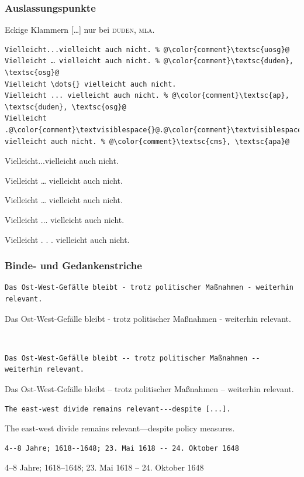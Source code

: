 \documentclass[handout]{beamer}
\begin{document}
\begin{frame}[fragile]
    \frametitle{Auslassungspunkte}
    Eckige Klammern [\dots{}] nur bei \textsc{duden}, \textsc{mla}.

    \pause

    \begin{lstlisting}[escapechar=\@]
Vielleicht...vielleicht auch nicht. % @\color{comment}\textsc{uosg}@
Vielleicht … vielleicht auch nicht. % @\color{comment}\textsc{duden}, \textsc{osg}@
Vielleicht \dots{} vielleicht auch nicht.
Vielleicht ... vielleicht auch nicht. % @\color{comment}\textsc{ap}, \textsc{duden}, \textsc{osg}@
Vielleicht .@\color{comment}\textvisiblespace{}@.@\color{comment}\textvisiblespace{}@. vielleicht auch nicht. % @\color{comment}\textsc{cms}, \textsc{apa}@
        \end{lstlisting}

    Vielleicht...vielleicht auch nicht.

    Vielleicht … vielleicht auch nicht.

    Vielleicht \dots{} vielleicht auch nicht.

    Vielleicht ... vielleicht auch nicht.

    Vielleicht . . . vielleicht auch nicht.\\[2ex]
\end{frame}

\begin{frame}[fragile]
    \frametitle{Binde- und Gedankenstriche}%
    \begin{wrong}
        \begin{lstlisting}
Das Ost-West-Gefälle bleibt - trotz politischer Maßnahmen - weiterhin relevant.
        \end{lstlisting}
        Das Ost-West-Gefälle bleibt - trotz politischer Maßnahmen - weiterhin relevant.
    \end{wrong}\\[2ex]\pause

    \begin{lstlisting}
Das Ost-West-Gefälle bleibt -- trotz politischer Maßnahmen -- weiterhin relevant.
    \end{lstlisting}
    Das Ost-West-Gefälle bleibt -- trotz politischer Maßnahmen -- weiterhin relevant.\\[2ex]\pause

    \begin{lstlisting}
The east-west divide remains relevant---despite [...].
    \end{lstlisting}
    The east-west divide remains relevant---despite policy measures.\\[2ex]
    \pause

    \begin{lstlisting}
4--8 Jahre; 1618--1648; 23. Mai 1618 -- 24. Oktober 1648
    \end{lstlisting}
    4--8 Jahre; 1618--1648; 23. Mai 1618 -- 24. Oktober 1648
\end{frame}
\end{document}
